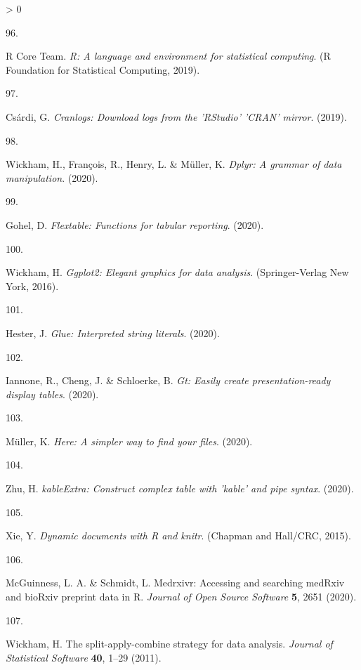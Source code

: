 \documentclass[a4paper, twoside]{templates/ociamthesis}
\newlength{\cslhangindent}
\newlength{\csllabelwidth}
\newenvironment{CSLReferences}[3] %
 {%
  \setlength{\parindent}{0pt}
  \ifodd #1 \everypar{\setlength{\hangindent}{\cslhangindent}}\ignorespaces\fi
  \ifnum #2 > 0
  \setlength{\parskip}{#2\baselineskip}
  \fi
 }%
 {}
\newcommand{\CSLLeftMargin}[1]{\parbox[t]{\maxof{\widthof{#1}}{\csllabelwidth}}{#1}}
\newcommand{\CSLRightInline}[1]{\parbox[t]{\linewidth - \csllabelwidth}{#1}}
\begin{document}
\begin{CSLReferences}{0}{0}
\leavevmode\hypertarget{ref-base}{}%
\CSLLeftMargin{96. }
\CSLRightInline{R Core Team. \emph{R: {A} language and environment for statistical computing}. ({R Foundation for Statistical Computing}, 2019).}

\leavevmode\hypertarget{ref-cranlogs}{}%
\CSLLeftMargin{97. }
\CSLRightInline{Csárdi, G. \emph{Cranlogs: {Download} logs from the '{RStudio}' '{CRAN}' mirror}. (2019).}

\leavevmode\hypertarget{ref-dplyr}{}%
\CSLLeftMargin{98. }
\CSLRightInline{Wickham, H., François, R., Henry, L. \& Müller, K. \emph{Dplyr: {A} grammar of data manipulation}. (2020).}

\leavevmode\hypertarget{ref-flextable}{}%
\CSLLeftMargin{99. }
\CSLRightInline{Gohel, D. \emph{Flextable: {Functions} for tabular reporting}. (2020).}

\leavevmode\hypertarget{ref-ggplot2}{}%
\CSLLeftMargin{100. }
\CSLRightInline{Wickham, H. \emph{Ggplot2: {Elegant} graphics for data analysis}. ({Springer-Verlag New York}, 2016).}

\leavevmode\hypertarget{ref-glue}{}%
\CSLLeftMargin{101. }
\CSLRightInline{Hester, J. \emph{Glue: {Interpreted} string literals}. (2020).}

\leavevmode\hypertarget{ref-gt}{}%
\CSLLeftMargin{102. }
\CSLRightInline{Iannone, R., Cheng, J. \& Schloerke, B. \emph{Gt: {Easily} create presentation-ready display tables}. (2020).}

\leavevmode\hypertarget{ref-here}{}%
\CSLLeftMargin{103. }
\CSLRightInline{Müller, K. \emph{Here: {A} simpler way to find your files}. (2020).}

\leavevmode\hypertarget{ref-kableExtra}{}%
\CSLLeftMargin{104. }
\CSLRightInline{Zhu, H. \emph{{kableExtra}: {Construct} complex table with 'kable' and pipe syntax}. (2020).}

\leavevmode\hypertarget{ref-knitr}{}%
\CSLLeftMargin{105. }
\CSLRightInline{Xie, Y. \emph{Dynamic documents with {R} and knitr}. ({Chapman and Hall/CRC}, 2015).}

\leavevmode\hypertarget{ref-medrxivr}{}%
\CSLLeftMargin{106. }
\CSLRightInline{McGuinness, L. A. \& Schmidt, L. Medrxivr: {Accessing} and searching {medRxiv} and {bioRxiv} preprint data in {R}. \emph{Journal of Open Source Software} \textbf{5}, 2651 (2020).}

\leavevmode\hypertarget{ref-plyr}{}%
\CSLLeftMargin{107. }
\CSLRightInline{Wickham, H. The split-apply-combine strategy for data analysis. \emph{Journal of Statistical Software} \textbf{40}, 1--29 (2011).}


\end{CSLReferences}
\end{document}
